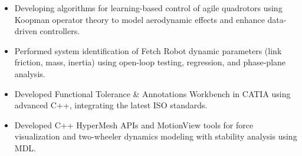 \documentclass[10pt,a4paper,ragged2e,withhyper]{altacv}
\begin{document}
\begin{paracol}{2}
\begin{itemize}
\item Developing algorithms for learning-based control of agile quadrotors using Koopman operator theory to model aerodynamic effects and enhance data-driven controllers.
\end{itemize}
\vspace{-0.5em}
\divider
{}
\begin{itemize}
\item Performed system identification of Fetch Robot dynamic parameters (link friction, mass, inertia) using open-loop testing, regression, and phase-plane analysis.
\end{itemize}
\vspace{-0.5em}
\divider

\vspace{-0.5em}
\divider

\begin{itemize}
\item Developed Functional Tolerance \& Annotations Workbench in CATIA using advanced C++, integrating the latest ISO standards.
\end{itemize}
\vspace{-0.5em}
\divider
 
\begin{itemize}
\item Developed C++ HyperMesh APIs and MotionView tools for force visualization and two-wheeler dynamics modeling with stability analysis using MDL.
\end{itemize}

\end{paracol}
\end{document}
